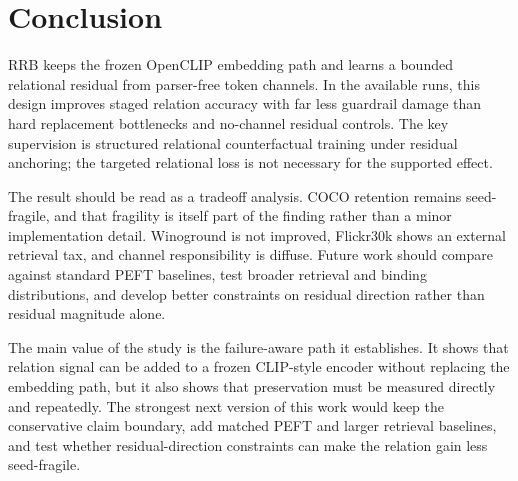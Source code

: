 \section{Conclusion}

RRB keeps the frozen OpenCLIP embedding path and learns a bounded relational residual from parser-free token channels. In the available runs, this design improves staged relation accuracy with far less guardrail damage than hard replacement bottlenecks and no-channel residual controls. The key supervision is structured relational counterfactual training under residual anchoring; the targeted relational loss is not necessary for the supported effect.

The result should be read as a tradeoff analysis. COCO retention remains seed-fragile, and that fragility is itself part of the finding rather than a minor implementation detail. Winoground is not improved, Flickr30k shows an external retrieval tax, and channel responsibility is diffuse. Future work should compare against standard PEFT baselines, test broader retrieval and binding distributions, and develop better constraints on residual direction rather than residual magnitude alone.

The main value of the study is the failure-aware path it establishes. It shows that relation signal can be added to a frozen CLIP-style encoder without replacing the embedding path, but it also shows that preservation must be measured directly and repeatedly. The strongest next version of this work would keep the conservative claim boundary, add matched PEFT and larger retrieval baselines, and test whether residual-direction constraints can make the relation gain less seed-fragile.

